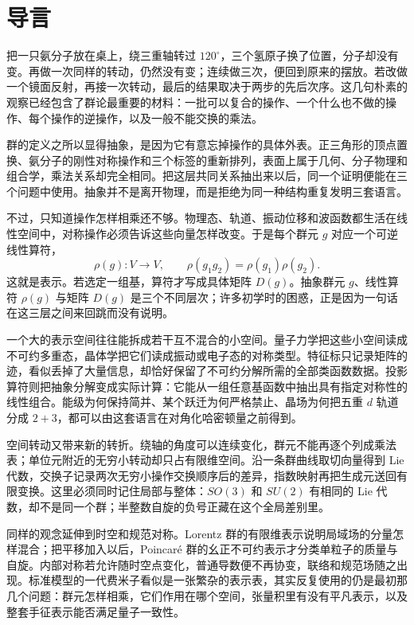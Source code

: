 \chapter*{导言}

把一只氨分子放在桌上，绕三重轴转过 \(120^\circ\)，三个氢原子换了位置，分子却没有变。再做一次同样的转动，仍然没有变；连续做三次，便回到原来的摆放。若改做一个镜面反射，再接一次转动，最后的结果取决于两步的先后次序。这几句朴素的观察已经包含了群论最重要的材料：一批可以复合的操作、一个什么也不做的操作、每个操作的逆操作，以及一般不能交换的乘法。

群的定义之所以显得抽象，是因为它有意忘掉操作的具体外表。正三角形的顶点置换、氨分子的刚性对称操作和三个标签的重新排列，表面上属于几何、分子物理和组合学，乘法关系却完全相同。把这层共同关系抽出来以后，同一个证明便能在三个问题中使用。抽象并不是离开物理，而是拒绝为同一种结构重复发明三套语言。

不过，只知道操作怎样相乘还不够。物理态、轨道、振动位移和波函数都生活在线性空间中，对称操作必须告诉这些向量怎样改变。于是每个群元 \(g\) 对应一个可逆线性算符，
\[
\rho(g):V\longrightarrow V,
\qquad
\rho(g_1g_2)=\rho(g_1)\rho(g_2).
\]
这就是表示。若选定一组基，算符才写成具体矩阵 \(D(g)\)。抽象群元 \(g\)、线性算符 \(\rho(g)\) 与矩阵 \(D(g)\) 是三个不同层次；许多初学时的困惑，正是因为一句话在这三层之间来回跳而没有说明。

一个大的表示空间往往能拆成若干互不混合的小空间。量子力学把这些小空间读成不可约多重态，晶体学把它们读成振动或电子态的对称类型。特征标只记录矩阵的迹，看似丢掉了大量信息，却恰好保留了不可约分解所需的全部类函数数据。投影算符则把抽象分解变成实际计算：它能从一组任意基函数中抽出具有指定对称性的线性组合。能级为何保持简并、某个跃迁为何严格禁止、晶场为何把五重 \(d\) 轨道分成 \(2+3\)，都可以由这套语言在对角化哈密顿量之前得到。

空间转动又带来新的转折。绕轴的角度可以连续变化，群元不能再逐个列成乘法表；单位元附近的无穷小转动却只占有限维空间。沿一条群曲线取切向量得到 Lie 代数，交换子记录两次无穷小操作交换顺序后的差异，指数映射再把生成元送回有限变换。这里必须同时记住局部与整体：\(SO(3)\) 和 \(SU(2)\) 有相同的 Lie 代数，却不是同一个群；半整数自旋的负号正藏在这个全局差别里。

同样的观念延伸到时空和规范对称。Lorentz 群的有限维表示说明局域场的分量怎样混合；把平移加入以后，Poincar\'e 群的幺正不可约表示才分类单粒子的质量与自旋。内部对称若允许随时空点变化，普通导数便不再协变，联络和规范场随之出现。标准模型的一代费米子看似是一张繁杂的表示表，其实反复使用的仍是最初那几个问题：群元怎样相乘，它们作用在哪个空间，张量积里有没有平凡表示，以及整套手征表示能否满足量子一致性。

